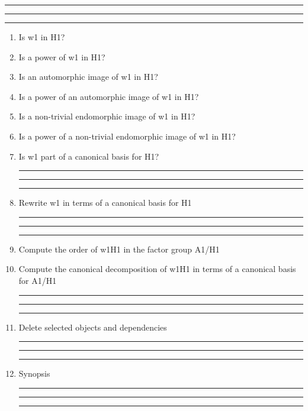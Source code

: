 
\bigskip
\hrule\hrule\hrule

\begin{enumerate}

\item Is w1 in H1?

\item Is a power of w1 in H1?

\item Is an automorphic image of w1 in H1?

\item Is a power of an automorphic image of w1 in H1?

\item Is a non-trivial endomorphic image of w1 in H1?

\item Is a power of a non-trivial endomorphic image of w1 in H1?

\item Is w1 part of a canonical basis for H1?

\bigskip
\hrule\hrule\hrule

\item Rewrite w1 in terms of a canonical basis for H1

\bigskip
\hrule\hrule\hrule

\item Compute the order of  w1H1 in the factor group A1/H1

\item Compute the canonical decomposition of w1H1 in terms of a
canonical basis for A1/H1


\bigskip
\hrule\hrule\hrule

\item Delete selected objects and dependencies

\bigskip
\hrule\hrule\hrule

\item
Synopsis

\bigskip
\hrule\hrule\hrule

\end{enumerate}
